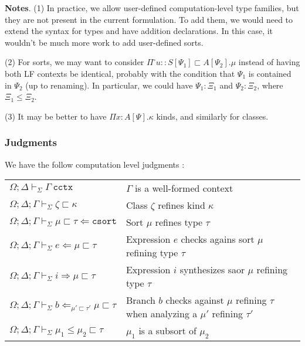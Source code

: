 \documentclass[letterpaper, 11pt]{article}
\newcommand{\Rar}{\Rightarrow}
\newcommand{\Lar}{\Leftarrow}
\newcommand{\csort}{\texttt{csort}}
\newcommand{\cctx}{\texttt{cctx}}
\begin{document}
    \textbf{Notes}. (1) In practice, we allow user-defined computation-level type families, but they are not present in the current formulation.  To add
    them, we would need to extend the syntax for types and have addition declarations.  In this case, it wouldn't be much more work to add user-defined
    sorts.

    (2) For sorts, we may want to consider $\Pi^\square u{::}S[\Psi_1] \sqsubset A[\Psi_2]. \mu$ instead of having both LF contexts be identical, probably
    with the condition that $\Psi_1$ is contained in $\Psi_2$ (up to renaming).  In particular, we could have $\Psi_1 {:} \Xi_1$ and $\Psi_2 {:} \Xi_2$,
    where $\Xi_1 \leq \Xi_2$.

    (3) It may be better to have $\Pi x{:}A[\Psi].\kappa$ kinds, and similarly for classes.

    \subsubsection{Judgments}
    We have the follow computation level judgments :

    \begin{tabular}{ll}
      $\Omega; \Delta \vdash_\Sigma \Gamma \ \cctx$                                         & $\Gamma$ is a well-formed context \\
      $\Omega; \Delta; \Gamma \vdash_\Sigma \zeta \sqsubset \kappa$                       & Class $\zeta$ refines kind $\kappa$ \\
      $\Omega; \Delta; \Gamma \vdash_\Sigma \mu \sqsubset \tau \Lar \csort$               & Sort $\mu$ refines type $\tau$ \\
      $\Omega; \Delta; \Gamma \vdash_\Sigma e \Lar \mu \sqsubset \tau$                    & Expression $e$ checks agains sort $\mu$ refining type $\tau$ \\
      $\Omega; \Delta; \Gamma \vdash_\Sigma i \Rar \mu \sqsubset \tau$                    & Expression $i$ synthesizes saor $\mu$ refining type $\tau$ \\
      $\Omega; \Delta; \Gamma \vdash_\Sigma b \Lar_{\mu' \sqsubset \tau'} \mu \sqsubset \tau$ & Branch $b$ checks against $\mu$ refining $\tau$ 
                                                                                           when analyzing a $\mu'$ refining $\tau'$ \\
      $\Omega; \Delta; \Gamma \vdash_\Sigma \mu_1 \leq \mu_2 \sqsubset \tau$              & $\mu_1$ is a subsort of $\mu_2$ 
    \end{tabular}
\end{document}
